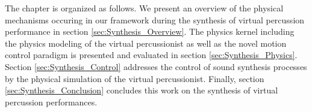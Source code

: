 The chapter is organized as follows. %
We present an overview of the physical mechanisms occuring in our framework during the synthesis of virtual percussion performance in section \ref{sec:Synthesis_Overview}. The physics kernel including the physics modeling of the virtual percussionist as well as the novel motion control paradigm is presented and evaluated in section \ref{sec:Synthesis_Physics}. Section \ref{sec:Synthesis_Control} addresses the control of sound synthesis processes by the physical simulation of the virtual percussionist. Finally, section \ref{sec:Synthesis_Conclusion} concludes this work on the synthesis of virtual percussion performances.







